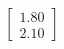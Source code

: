 \documentclass[preview]{standalone}
\begin{document}
\begin{align*}
\begin{bmatrix} 1.80 \\ 2.10 \end{bmatrix}
\end{align*}
\end{document}

